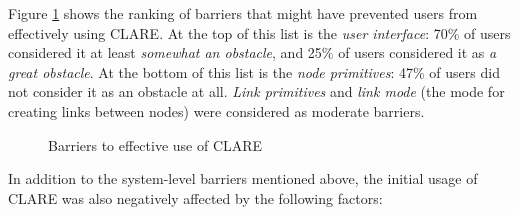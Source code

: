 Figure \ref{fig:clare-barriers} shows the ranking of barriers that might
have prevented users from effectively using CLARE. At the top of this list
is the {\it user interface\/}: 70\% of users considered it at least {\it
somewhat an obstacle\/}, and 25\% of users considered it as {\it a great
obstacle\/}.  At the bottom of this list is the {\it node primitives\/}:
47\% of users did not consider it as an obstacle at all. {\it Link
primitives\/} and {\it link mode\/} (the mode for creating links between
nodes) were considered as moderate barriers.

\begin{figure}[hbtp]
 \caption{Barriers to effective use of CLARE}
  \label{fig:clare-barriers}
\end{figure}

In addition to the system-level barriers mentioned above, the initial usage
of CLARE was also negatively affected by the following factors:

